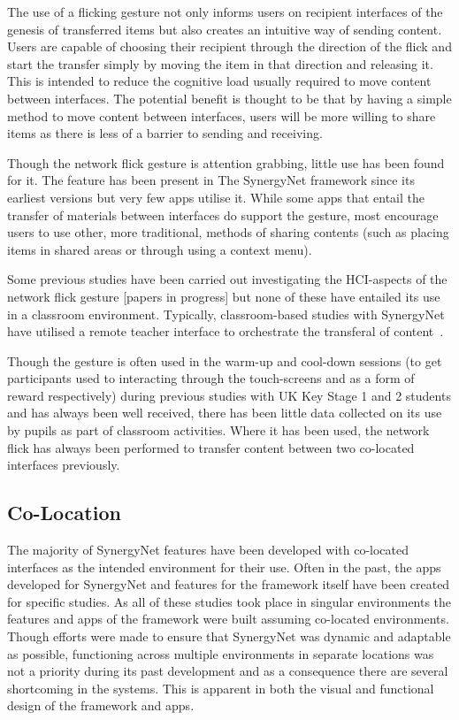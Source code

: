 \documentclass[a4paper,11pt]{article}
\begin{document}
The use of a flicking gesture not only informs users on recipient interfaces of the genesis of transferred items but also creates an intuitive way of sending content.
Users are capable of choosing their recipient through the direction of the flick and start the transfer simply by moving the item in that direction and releasing it.
This is intended to reduce the cognitive load usually required to move content between interfaces.
The potential benefit is thought to be that by having a simple method to move content between interfaces, users will be more willing to share items as there is less of a barrier to sending and receiving.

Though the network flick gesture is attention grabbing, little use has been found for it.
The feature has been present in The SynergyNet framework since its earliest versions but very few apps utilise it.
While some apps that entail the transfer of materials between interfaces do support the gesture, most encourage users to use other, more traditional, methods of sharing contents (such as placing items in shared areas or through using a context menu).

Some previous studies have been carried out investigating the HCI-aspects of the network flick gesture [papers in progress] but none of these have entailed its use in a classroom environment.
Typically, classroom-based studies with SynergyNet have utilised a remote teacher interface to orchestrate the transferal of content~\cite{joycegibbons:2016}.

Though the gesture is often used in the warm-up and cool-down sessions (to get participants used to interacting through the touch-screens and as a form of reward respectively) during previous studies with UK Key Stage 1 and 2 students and has always been well received, there has been little data collected on its use by pupils as part of classroom activities.
Where it has been used, the network flick has always been performed to transfer content between two co-located interfaces previously.

\subsection{Co-Location}

The majority of SynergyNet features have been developed with co-located interfaces as the intended environment for their use.
Often in the past, the apps developed for SynergyNet and features for the framework itself have been created for specific studies.
As all of these studies took place in singular environments the features and apps of the framework were built assuming co-located environments.
Though efforts were made to ensure that SynergyNet was dynamic and adaptable as possible, functioning across multiple environments in separate locations was not a priority during its past development and as a consequence there are several shortcoming in the systems.
This is apparent in both the visual and functional design of the framework and apps.
\end{document}
